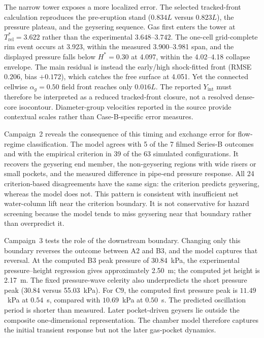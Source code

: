 The narrow tower exposes a more localized error. The selected
tracked-front calculation reproduces the pre-eruption stand ($0.834L$ versus
$0.823L$), the pressure plateau, and the geysering sequence. Gas first enters
the tower at $T_{\mathrm{rel}}^{*}=3.622$ rather than the experimental
$3.648$--$3.742$. The one-cell grid-complete rim event occurs at 3.923, within
the measured 3.900--3.981 span, and the displayed pressure falls below
$H^*=0.30$ at 4.097, within the 4.02--4.18 collapse envelope. The main
residual is instead the early/high shock-fitted front (RMSE $0.206$, bias
$+0.172$), which catches the free surface at 4.051. Yet the connected cellwise
$\alpha_g=0.50$ field front reaches only $0.016L$. The reported
$Y_{\mathrm{int}}$ must therefore be interpreted as a reduced tracked-front
closure, not a resolved dense-core isocontour. Diameter-group velocities
reported in the source provide contextual scales rather than Case-B-specific
error measures.

Campaign~2 reveals the consequence of this timing and exchange error for
flow-regime classification. The model agrees with 5 of the 7 filmed Series-B
outcomes and with the empirical criterion in 39 of the 63 simulated
configurations. It recovers the geysering end member, the non-geysering regions
with wide risers or small pockets, and the measured difference in pipe-end
pressure response. All 24 criterion-based disagreements have the same sign:
the criterion predicts geysering, whereas the model does not. This pattern is
consistent with insufficient net water-column lift near the criterion
boundary. It is not conservative for hazard screening because the model tends
to miss geysering near that boundary rather than overpredict it.

Campaign~3 tests the role of the downstream boundary. Changing only this
boundary reverses the outcome between A2 and B3, and the model captures that
reversal. At the computed B3 peak pressure of 30.84~kPa, the experimental
pressure--height regression gives approximately 2.50~m; the computed jet
height is 2.17~m. The fixed pressure-wave celerity also underpredicts the short
pressure peak (30.84 versus 55.03~kPa). For C9, the computed first pressure
peak is $11.49$~kPa at $0.54$~s, compared with $10.69$~kPa at $0.50$~s. The
predicted oscillation period is shorter than measured. Later pocket-driven
geysers lie outside the composite one-dimensional representation. The chamber
model therefore captures the initial transient response but not the later
gas-pocket dynamics.

